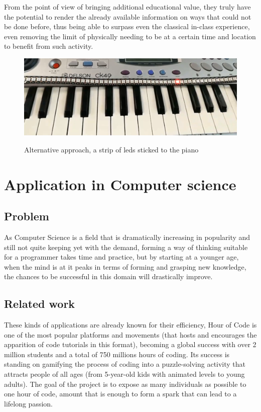 \documentclass[12 pct]{report}
\begin{document}
From the point of view of bringing additional educational value, they truly have the potential to render the already available information on ways that could not be done before, thus being able to surpass even the classical in-class experience, even removing the limit of physically needing to be at a certain  time and location to benefit from such activity.
\begin{figure}[]
\includegraphics[width=1.0\textwidth]{piano-leds}
\centering
\label{fig:feature-points}
\caption{Alternative approach, a strip of leds sticked to the piano}
\end{figure}


\chapter{Application in Computer science}

\section{Problem}
As Computer Science is a field that is dramatically increasing in popularity and still not quite keeping yet with the demand, forming a way of thinking suitable for a programmer takes time and practice, but by starting at a younger age, when the mind is at it peaks in terms of forming and grasping new knowledge, the chances to be successful in this domain will drastically improve.


\section{Related work}
These kinds of applications are already known for their efficiency, Hour of Code is one of the most popular platforms and movements (that hosts and encourages the apparition of code tutorials in this format), becoming a global success with over 2 million students and a total of 750 millions hours of coding. Its success is standing on gamifying the process of coding into a puzzle-solving activity that attracts people of all ages (from 5-year-old kids with animated levels to young adults). The goal of the project is to expose as many individuals as possible to one hour of code, amount that is enough to form a spark that can lead to a lifelong passion.
\end{document}
